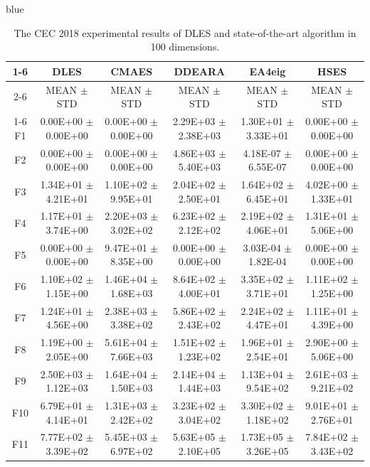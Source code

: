 \documentclass[journal, onecolumn]{IEEEtran}
\begin{document}
\begin{color}{blue}
\begin{table}[htbp!]
	\centering
	\caption{The CEC 2018 experimental results of DLES and state-of-the-art algorithm in 100 dimensions.}
	\label{CEC2018_100}
		\begin{tabular}{c|ccccc}
			\cline{1-6}
			 &	DLES			 &	CMAES				 &	DDEARA				 &	EA4eig				 &	HSES			\\	\cline{2-6}	
		&	MEAN	$\pm$	STD	 &	MEAN	$\pm$	STD		 &	MEAN	$\pm$	STD		 &	MEAN	$\pm$	STD		 &	MEAN	$\pm$	STD	\\	\cline{1-6}
		F1	 &	0.00E+00	$\pm$	0.00E+00	 &	0.00E+00	$\pm$	0.00E+00		 &	2.29E+03	$\pm$	2.38E+03		 &	1.30E+01	$\pm$	3.33E+01		 &	0.00E+00	$\pm$	0.00E+00	\\	
		F2	 &	0.00E+00	$\pm$	0.00E+00	 &	0.00E+00	$\pm$	0.00E+00		 &	4.86E+03	$\pm$	5.40E+03		 &	4.18E-07	$\pm$	6.55E-07		 &	0.00E+00	$\pm$	0.00E+00	\\	
		F3	 &	1.34E+01	$\pm$	4.21E+01	 &	1.10E+02	$\pm$	9.95E+01		 &	2.04E+02	$\pm$	2.50E+01		 &	1.64E+02	$\pm$	6.45E+01		 &	4.02E+00	$\pm$	1.33E+01	\\	
		F4	 &	1.17E+01	$\pm$	3.74E+00	 &	2.20E+03	$\pm$	3.02E+02		 &	6.23E+02	$\pm$	2.12E+02		 &	2.19E+02	$\pm$	4.06E+01		 &	1.31E+01	$\pm$	5.06E+00	\\	
		F5	 &	0.00E+00	$\pm$	0.00E+00	 &	9.47E+01	$\pm$	8.35E+00		 &	0.00E+00	$\pm$	0.00E+00		 &	3.03E-04	$\pm$	1.82E-04		 &	0.00E+00	$\pm$	0.00E+00	\\	
		F6	 &	1.10E+02	$\pm$	1.15E+00	 &	1.46E+04	$\pm$	1.68E+03		 &	8.64E+02	$\pm$	4.00E+01		 &	3.35E+02	$\pm$	3.71E+01		 &	1.11E+02	$\pm$	1.25E+00	\\	
		F7	 &	1.24E+01	$\pm$	4.56E+00	 &	2.38E+03	$\pm$	3.38E+02		 &	5.86E+02	$\pm$	2.43E+02		 &	2.24E+02	$\pm$	4.47E+01		 &	1.11E+01	$\pm$	4.39E+00	\\	
		F8	 &	1.19E+00	$\pm$	2.05E+00	 &	5.61E+04	$\pm$	7.66E+03		 &	1.51E+02	$\pm$	1.23E+02		 &	1.96E+01	$\pm$	2.54E+01		 &	2.90E+00	$\pm$	5.06E+00	\\	
		F9	 &	2.50E+03	$\pm$	1.12E+03	 &	1.64E+04	$\pm$	1.50E+03		 &	2.14E+04	$\pm$	1.44E+03		 &	1.13E+04	$\pm$	9.54E+02		 &	2.61E+03	$\pm$	9.21E+02	\\	
		F10	 &	6.79E+01	$\pm$	4.14E+01	 &	1.31E+03	$\pm$	2.42E+02		 &	3.23E+02	$\pm$	3.04E+02		 &	3.30E+02	$\pm$	1.18E+02		 &	9.01E+01	$\pm$	2.76E+01	\\	
		F11	 &	7.77E+02	$\pm$	3.39E+02	 &	5.45E+03	$\pm$	6.97E+02		 &	5.63E+05	$\pm$	2.10E+05		 &	1.73E+05	$\pm$	3.26E+05		 &	7.84E+02	$\pm$	3.43E+02	\\	

\end{tabular}
\end{table}
\end{color}
\end{document}
